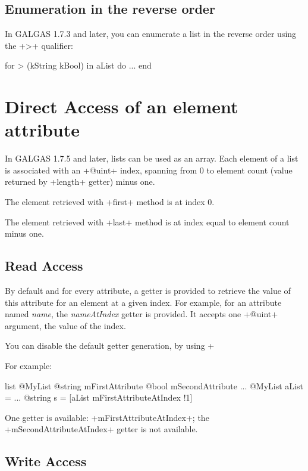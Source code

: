 \subsection{Enumeration in the reverse order}

In GALGAS 1.7.3 and later, you can enumerate a list in the reverse order using the \ggs+>+ qualifier:

\begin{galgas}
for > (kString kBool) in aList do
  ...
end
\end{galgas}




\section{Direct Access of an element attribute}

In GALGAS 1.7.5 and later, lists can be used as an array. Each element of a list is associated with an \ggs+@uint+ index, spanning from 0 to element count (value returned by \ggs+length+ getter) minus one.

The element retrieved with \ggs+first+ method is at index 0.

The element retrieved with \ggs+last+ method is at index equal to element count minus one.

\subsection{Read Access}

By default and for every attribute, a getter is provided to retrieve the value of this attribute for an element at a given index. For example, for an attribute named \emph{name}, the \emph{nameAtIndex} getter is provided. It accepts one \ggs+@uint+ argument, the value of the index.

You can disable the default getter generation, by using \ggs+%

For example:
\begin{galgas}
list @MyList {
  @string mFirstAttribute
  @bool mSecondAttribute %
}
...
@MyList aList = ...
@string s = [aList mFirstAttributeAtIndex !1]
\end{galgas}

One getter is available: \ggs+mFirstAttributeAtIndex+; the \ggs+mSecondAttributeAtIndex+ getter is not available.


\subsection{Write Access}

